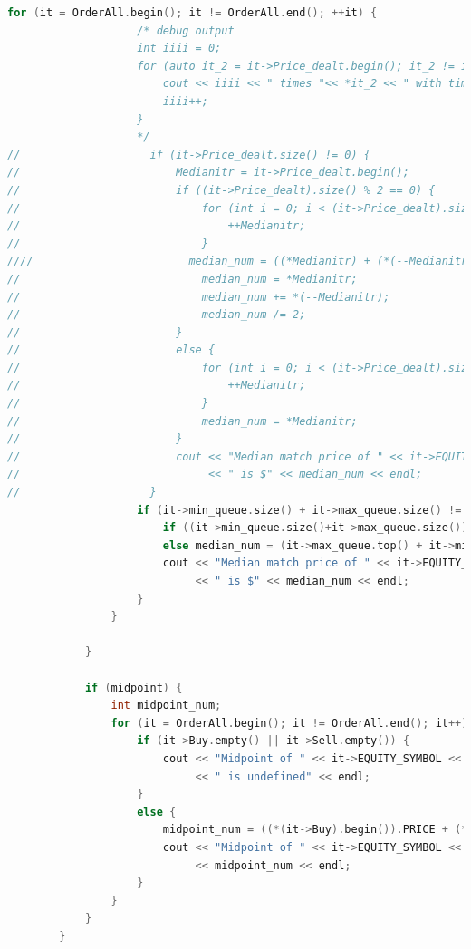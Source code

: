 \documentclass{article}
\begin{document}
\begin{lstlisting}[language=C++]
                for (it = OrderAll.begin(); it != OrderAll.end(); ++it) {
                    /* debug output
                    int iiii = 0;
                    for (auto it_2 = it->Price_dealt.begin(); it_2 != it->Price_dealt.end(); it_2++) {
                        cout << iiii << " times "<< *it_2 << " with timestamp " << timestamp << endl;
                        iiii++;
                    }
                    */
//                    if (it->Price_dealt.size() != 0) {
//                        Medianitr = it->Price_dealt.begin();
//                        if ((it->Price_dealt).size() % 2 == 0) {
//                            for (int i = 0; i < (it->Price_dealt).size() / 2; i++) {
//                                ++Medianitr;
//                            }
////                        median_num = ((*Medianitr) + (*(--Medianitr))) / 2;
//                            median_num = *Medianitr;
//                            median_num += *(--Medianitr);
//                            median_num /= 2;
//                        }
//                        else {
//                            for (int i = 0; i < (it->Price_dealt).size() / 2; i++) {
//                                ++Medianitr;
//                            }
//                            median_num = *Medianitr;
//                        }
//                        cout << "Median match price of " << it->EQUITY_SYMBOL << " at time " << current_timestamp
//                             << " is $" << median_num << endl;
//                    }
                    if (it->min_queue.size() + it->max_queue.size() != 0) {
                        if ((it->min_queue.size()+it->max_queue.size())%2==1) median_num = it->max_queue.top();
                        else median_num = (it->max_queue.top() + it->min_queue.top())/2;
                        cout << "Median match price of " << it->EQUITY_SYMBOL << " at time " << current_timestamp
                             << " is $" << median_num << endl;
                    }
                }

            }

            if (midpoint) {
                int midpoint_num;
                for (it = OrderAll.begin(); it != OrderAll.end(); it++) {
                    if (it->Buy.empty() || it->Sell.empty()) {
                        cout << "Midpoint of " << it->EQUITY_SYMBOL << " at time " << current_timestamp
                             << " is undefined" << endl;
                    }
                    else {
                        midpoint_num = ((*(it->Buy).begin()).PRICE + (*(it->Sell).begin()).PRICE) / 2;
                        cout << "Midpoint of " << it->EQUITY_SYMBOL << " at time " << current_timestamp << " is $"
                             << midpoint_num << endl;
                    }
                }
            }
        }


\end{lstlisting}
\end{document}
